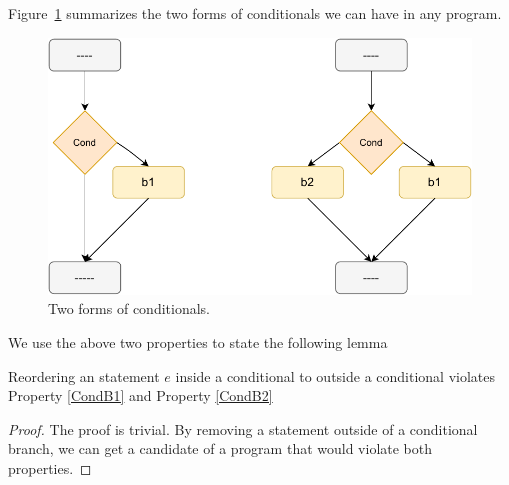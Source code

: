         Figure~\ref{reord:conditionals} summarizes the two forms of conditionals we can have in any program. 
        \begin{figure}[H]
            \centering 
            \includegraphics[scale=0.7]{4.InstructionReordering/5.ValidReorderingProgram/Conditionals2Form.pdf}
            \caption{Two forms of conditionals.}
            \label{reord:conditionals}
        \end{figure}


        We use the above two properties to state the following lemma 
        \begin{lemma}
            \label{CondBranchLemma}
            Reordering an statement $e$ inside a conditional to outside a conditional violates Property \ref{CondB1} and Property \ref{CondB2}
        \end{lemma}

        \begin{proof}
            The proof is trivial. 
            By removing a statement outside of a conditional branch, we can get a candidate of a program that would violate both properties. 
        \end{proof}

